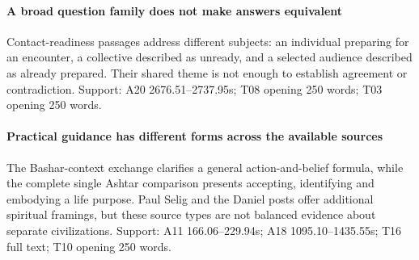 \paragraph{A broad question family does not make answers equivalent} Contact-readiness passages address different subjects: an individual preparing for an encounter, a collective described as unready, and a selected audience described as already prepared. Their shared theme is not enough to establish agreement or contradiction. Support: A20 2676.51--2737.95s; T08 opening 250 words; T03 opening 250 words.

\paragraph{Practical guidance has different forms across the available sources} The Bashar-context exchange clarifies a general action-and-belief formula, while the complete single Ashtar comparison presents accepting, identifying and embodying a life purpose. Paul Selig and the Daniel posts offer additional spiritual framings, but these source types are not balanced evidence about separate civilizations. Support: A11 166.06--229.94s; A18 1095.10--1435.55s; T16 full text; T10 opening 250 words.
